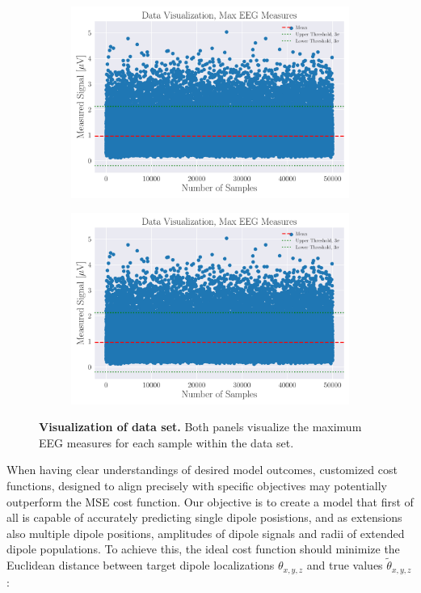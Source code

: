 \documentclass[a4paper, UKenglish, 11pt]{uiomaster}
\begin{document}
\begin{figure}[!htb]
    \centering
    \begin{subfigure}[b]{0.45\linewidth}
        \centering
        \includegraphics[width=\linewidth]{figures/data_visualization_max.pdf}
    \end{subfigure}
    \hfill
    \begin{subfigure}[b]{0.45\linewidth}
        \centering
        \includegraphics[width=\linewidth]{figures/data_visualization_max.pdf}
    \end{subfigure}
    \caption{\textbf{Visualization of data set.} Both panels visualize the maximum EEG measures for each sample within the data set.}
    \label{fig:outliers}
\end{figure}

When having clear understandings of desired model outcomes, customized cost functions, designed to align precisely with specific objectives may potentially outperform the MSE cost function. Our objective is to create a model that first of all is capable of accurately predicting single dipole posistions, and as extensions also multiple dipole positions, amplitudes of dipole signals and radii of extended dipole populations.  To achieve this, the ideal cost function should minimize the Euclidean distance between target dipole localizations ${\theta}_{x,y,z}$ and true values $\tilde{\theta}_{x,y,z}$:
\end{document}
